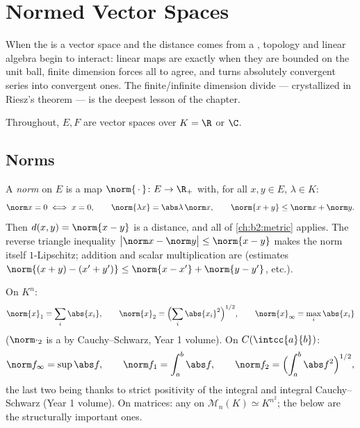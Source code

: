 \chapter{Normed Vector Spaces}\label{ch:b2:nvs}

When the  is a vector space and the distance comes from
a , topology and linear algebra begin to interact: linear maps
are  exactly when they are bounded on the unit ball,
finite dimension forces all  to agree, and  turns
absolutely convergent series into convergent ones. The
finite/infinite dimension divide --- crystallized in Riesz's theorem
--- is the deepest lesson of the chapter.

Throughout, $E, F$ are vector spaces over $K = \R$ or $\C$.

\section{Norms}

\begin{definition}\label{def:b2:nvs:norm}
A \emph{norm} on $E$ is a map $\norm{\,\cdot\,} \colon E
\to \R_+$ with, for all $x, y \in E$, $\lambda \in K$:
\[
\norm x = 0 \iff x = 0,
\qquad
\norm{\lambda x} = \abs\lambda\,\norm x,
\qquad
\norm{x + y} \leq \norm x + \norm y .
\]
Then $d(x, y) = \norm{x - y}$ is a distance, and all of
\cref{ch:b2:metric} applies. The reverse triangle inequality
$\bigl|\norm x - \norm y\bigr| \leq \norm{x - y}$ makes the norm
itself $1$-Lipschitz; addition and scalar multiplication are
 (estimates $\norm{(x + y) - (x' + y')} \leq \norm{x -
x'} + \norm{y - y'}$, etc.).
\end{definition}

\begin{example}\label{ex:b2:nvs:examples}
On $K^n$:
\[
\norm{x}_1 = \sum_i \abs{x_i},
\qquad
\norm{x}_2 = \Bigl(\sum_i \abs{x_i}^2\Bigr)^{1/2},
\qquad
\norm{x}_\infty = \max_i \abs{x_i}
\]
($\norm\cdot_2$ is a  by Cauchy--Schwarz, Year 1 volume). On
$C(\intcc{a}{b})$:
\[
\norm f_\infty = \sup \abs f,
\qquad
\norm f_1 = \int_a^b \abs f,
\qquad
\norm f_2 = \Bigl(\int_a^b \abs f^2\Bigr)^{1/2},
\]
the last two being  thanks to strict positivity of the
integral and integral Cauchy--Schwarz (Year 1 volume). On matrices:
any  on $\mathcal M_n(K) \simeq K^{n^2}$; the 
below are the structurally important ones.
\end{example}

